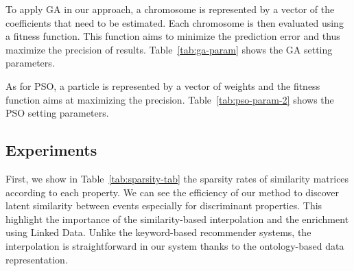 
To apply GA in our approach, a chromosome is represented by a vector of the coefficients that need to be estimated. Each chromosome is then evaluated using a fitness function. This function aims to minimize the prediction error and thus maximize the precision of results. Table~\ref{tab:ga-param} shows the GA setting parameters.

\begin{table}[H]
\end{table}



As for PSO, a particle is represented by a vector of weights and the fitness function aims at maximizing the precision. Table~\ref{tab:pso-param-2} shows the PSO setting parameters.

\begin{table}[H]
\end{table}


\subsection{Experiments}
First, we show in Table~\ref{tab:sparsity-tab} the sparsity rates of similarity matrices according to each property. We can see the efficiency of our method to discover latent similarity between events especially for discriminant properties. This highlight the importance of the similarity-based interpolation and the enrichment using Linked Data. Unlike the keyword-based recommender systems, the interpolation is straightforward in our system thanks to the ontology-based data representation.

